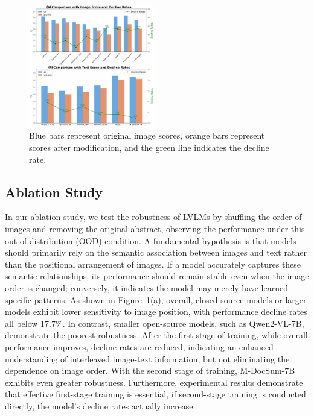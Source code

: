\begin{figure}[t]
\centering
\includegraphics[width=0.49\textwidth]{figs/ablation}
\caption{Blue bars represent original image scores, orange bars represent scores after modification, and the green line indicates the decline rate.}
\label{fig:ablation}
\end{figure}


\subsection{Ablation Study}
In our ablation study, we test the robustness of LVLMs by shuffling the order of images and removing the original abstract, observing the performance under this out-of-distribution (OOD) condition.
A fundamental hypothesis is that models should primarily rely on the semantic association between images and text rather than the positional arrangement of images. 
If a model accurately captures these semantic relationships, its performance should remain stable even when the image order is changed; conversely, it indicates the model may merely have learned specific patterns.
As shown in Figure~\ref{fig:ablation}(a), overall, closed-source models or larger models exhibit lower sensitivity to image position, with performance decline rates all below 17.7\%. 
In contrast, smaller open-source models, such as Qwen2-VL-7B, demonstrate the poorest robustness. After the first stage of training, while overall performance improves, decline rates are reduced, indicating an enhanced understanding of interleaved image-text information, but not eliminating the dependence on image order. 
With the second stage of training, M-DocSum-7B exhibits even greater robustness. 
Furthermore, experimental results demonstrate that effective first-stage training is essential, if second-stage training is conducted directly, the model's decline rates actually increase.

